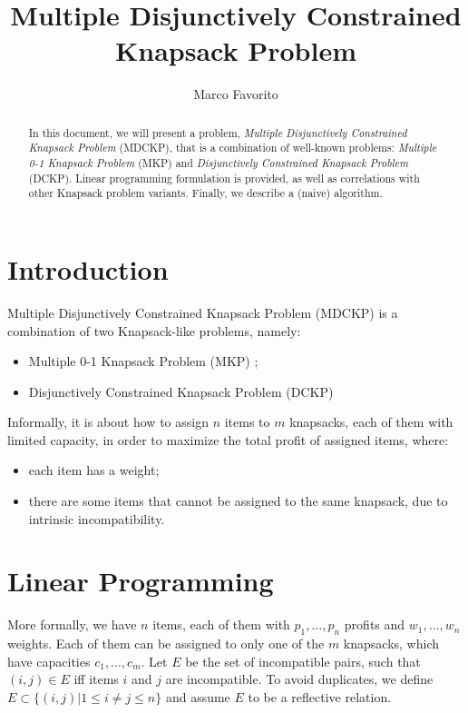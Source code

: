 \documentclass[]{article}
\title{Multiple Disjunctively Constrained Knapsack Problem}
\author{Marco Favorito}
\date{}
\begin{document}
\maketitle

\begin{abstract}
In this document, we will present a problem, \emph{Multiple Disjunctively Constrained Knapsack Problem} (MDCKP), that is a combination of well-known problems: \emph{Multiple 0-1 Knapsack Problem} (MKP) and \emph{Disjunctively Constrained Knapsack Problem} (DCKP). Linear programming formulation is provided, as well as correlations with other Knapsack problem variants. Finally, we describe a (naive) algorithm.
\end{abstract}

\section{Introduction}

Multiple Disjunctively Constrained Knapsack Problem (MDCKP) is a combination of two Knapsack-like problems, namely: 

\begin{itemize}
	\item Multiple 0-1 Knapsack Problem (MKP) \cite{Lagoudakis96the0-1, Martello:1990:KPA:98124};
	\item Disjunctively Constrained Knapsack Problem (DCKP) \cite{Senisuka_reductionand}
\end{itemize}

Informally, it is about how to assign $n$ items to $m$ knapsacks, each of them with limited capacity, in order to maximize the total profit of assigned items, where:
\begin{itemize}
	\item each item has a weight;
	\item there are some items that cannot be assigned to the same knapsack, due to intrinsic incompatibility.
\end{itemize}

\section{Linear Programming}
More formally, we have $n$ items, each of them with $p_1, \dots, p_n$ profits and $w_1, \dots, w_n$ weights.  Each of them can be assigned to only one of the $m$ knapsacks, which have capacities $c_1, \dots, c_m$. Let $E$ be the set of incompatible pairs, such that $(i, j)\in E$ iff items $i$ and $j$ are incompatible. To avoid duplicates, we define $E \subset \{(i, j) | 1 \le i \neq j \le n\}$ and assume $E$ to be a reflective relation.
\end{document}
